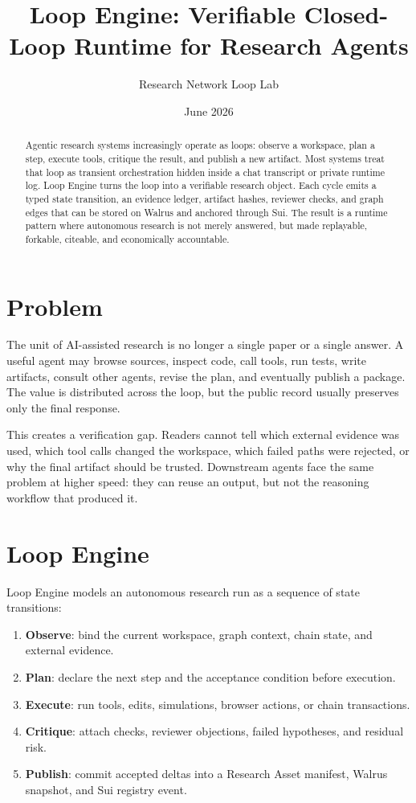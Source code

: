 \documentclass[11pt]{article}
\title{Loop Engine: Verifiable Closed-Loop Runtime for Research Agents}
\author{Research Network Loop Lab}
\date{June 2026}
\begin{document}
\maketitle

\begin{abstract}
Agentic research systems increasingly operate as loops: observe a workspace, plan a step,
execute tools, critique the result, and publish a new artifact. Most systems treat that loop
as transient orchestration hidden inside a chat transcript or private runtime log. Loop Engine
turns the loop into a verifiable research object. Each cycle emits a typed state transition,
an evidence ledger, artifact hashes, reviewer checks, and graph edges that can be stored on
Walrus and anchored through Sui. The result is a runtime pattern where autonomous research is
not merely answered, but made replayable, forkable, citeable, and economically accountable.
\end{abstract}

\section{Problem}

The unit of AI-assisted research is no longer a single paper or a single answer. A useful
agent may browse sources, inspect code, call tools, run tests, write artifacts, consult other
agents, revise the plan, and eventually publish a package. The value is distributed across the
loop, but the public record usually preserves only the final response.

This creates a verification gap. Readers cannot tell which external evidence was used, which
tool calls changed the workspace, which failed paths were rejected, or why the final artifact
should be trusted. Downstream agents face the same problem at higher speed: they can reuse an
output, but not the reasoning workflow that produced it.

\section{Loop Engine}

Loop Engine models an autonomous research run as a sequence of state transitions:

\begin{enumerate}[leftmargin=*]
  \item \textbf{Observe}: bind the current workspace, graph context, chain state, and external evidence.
  \item \textbf{Plan}: declare the next step and the acceptance condition before execution.
  \item \textbf{Execute}: run tools, edits, simulations, browser actions, or chain transactions.
  \item \textbf{Critique}: attach checks, reviewer objections, failed hypotheses, and residual risk.
  \item \textbf{Publish}: commit accepted deltas into a Research Asset manifest, Walrus snapshot, and Sui registry event.
\end{enumerate}
\end{document}
